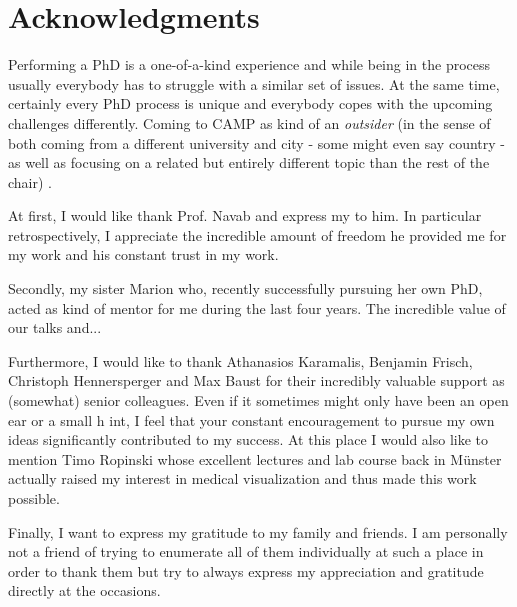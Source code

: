 %
\chapter*{Acknowledgments}
\label{sec:acknowledgement}

Performing a PhD is a one-of-a-kind experience and while being in the process usually everybody has to struggle with a similar set of issues.
At the same time, certainly every PhD process is unique and everybody copes with the upcoming challenges differently.
Coming to CAMP as kind of an \emph{outsider} (in the sense of both coming from a different university and city - some might even say country - as well as focusing on a related but entirely different topic than the rest of the chair) .

At first, I would like thank Prof. Navab and express my  to him. In particular retrospectively, I appreciate the incredible amount of freedom he provided me for my work and his constant trust in my work.

Secondly,  my sister Marion who, recently successfully pursuing her own PhD, acted as kind of mentor for me during the last four years.
The incredible value of our talks and...

Furthermore, I would like to thank Athanasios Karamalis, Benjamin Frisch, Christoph Hennersperger and Max Baust for their incredibly valuable support as (somewhat) senior colleagues. 
Even if it sometimes might only have been an open ear or a small h  int, I feel that your constant encouragement to pursue my own ideas significantly contributed to my success.
At this place I would also like to mention Timo Ropinski whose excellent lectures and lab course back in Münster actually raised my interest in medical visualization and thus made this work  possible.

Finally, I want to express my gratitude to my family and friends. 
I am personally not a friend of trying to enumerate all of them individually at such a place in order to thank them but try to always express my appreciation and gratitude directly at the  occasions.



